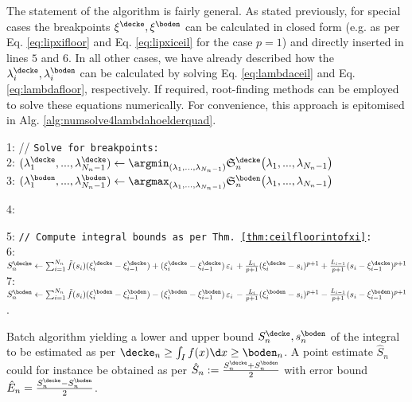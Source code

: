 The statement of the algorithm is fairly general. As stated previously, for special cases the breakpoints $\xi^\decke, \xi^\boden$ can be calculated in closed form (e.g. as per Eq. \ref{eq:lipxifloor} and Eq. \ref{eq:lipxiceil} for the case $p=1$) and directly inserted in lines $5$ and $6$. In all other cases, we have already described how the $\lambda_i^\decke, \lambda_i^\boden$ can be calculated by solving Eq. \ref{eq:lambdaceil} and Eq. \ref{eq:lambdafloor}, respectively. If required, root-finding methods can be employed to solve these equations numerically. For convenience, this approach is epitomised in Alg. \ref{alg:numsolve4lambdahoelderquad}.

\begin{algorithm} \label{alg:numsolve4lambdahoelderquad}
\begin{small}
%
\BlankLine
1: // \texttt{Solve for breakpoints: } \\
2: $ (\lambda_1^\decke,...,\lambda_{{N_n}-1}^\decke) \leftarrow \argmin_{(\lambda_1,...,\lambda_{{N_n}-1})} \mathfrak S^\decke_n\bigl(\lambda_1,...,\lambda_{{N_n}-1}\bigr)$\\
3: 
$ (\lambda_1^\boden,...,\lambda_{{N_n}-1}^\boden) \leftarrow \argmax_{(\lambda_1,...,\lambda_{{N_n}-1})} \mathfrak S^\boden_n\bigl(\lambda_1,...,\lambda_{{N_n}-1}\bigr)$

4: 

5:  \texttt{// Compute integral bounds as per Thm. \ref{thm:ceilfloorintofxi}:}\\
6: $S^\decke_n \leftarrow \sum_{i=1}^{N_n}  \tilde f(s_i) (\xi_{i}^\decke - \xi_{i-1}^\decke) +  (\xi_{i}^\decke - \xi_{i-1}^\decke)\, \varepsilon_i \,+ \frac{L_i}{{p+1}} (\xi_{i}^\decke-s_i )^{p+1}+  \frac{L_{i-1}}{{p+1}}(s_i-\xi_{i-1}^\decke)^{p+1} $\\	 
7: $S^\boden_n \leftarrow \sum_{i=1}^{N_n}  \tilde f(s_i) (\xi_{i}^\boden - \xi_{i-1}^\boden) - (\xi_i^\boden - \xi_{i-1}^\boden)\, \varepsilon_i \,- \frac{L_i}{{p+1}} (\xi_i^\boden-s_i )^{p+1} - \frac{L_{i-1}}{{p+1}}(s_i-\xi_{i-1}^\boden)^{p+1}   $.
\BlankLine
\caption{Batch algorithm yielding a lower and upper bound $S^\decke_n, s^\boden_n $ of the integral to be estimated as per $\decke_n \geq \int_I f(x) \d x \geq \boden_n $. A point estimate $\hat S_n$ could for instance be obtained as per $\hat S_n := \frac{S^\decke_n + S^\boden_n}{2} $ with error bound $\hat E_n = \frac{S^\decke_n - S^\boden_n}{2}$.}


\end{small}
\end{algorithm}


